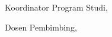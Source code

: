 \vspace{0.75cm}
\noindent\begin{minipage}[t]{0.47\textwidth}
    \centering
    Koordinator Program Studi,\\[2.5cm]

\end{minipage}%
\hfill%
\begin{minipage}[t]{0.47\textwidth}
    \centering
    Dosen Pembimbing,\\[2.5cm]

\end{minipage}%

